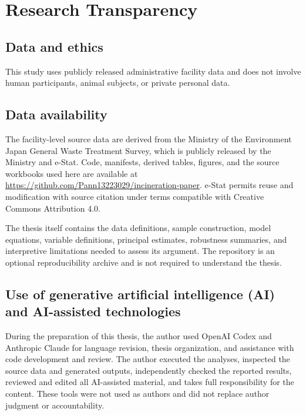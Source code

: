 \documentclass[12pt,a4paper]{article}
\begin{document}
\section*{Research Transparency}

\subsection*{Data and ethics}

This study uses publicly released administrative facility data and does not
involve human participants, animal subjects, or private personal data.

\subsection*{Data availability}

The facility-level source data are derived from the Ministry of the Environment
Japan General Waste Treatment Survey, which is publicly released by the
Ministry and e-Stat. Code, manifests, derived tables, figures, and the source
workbooks used here are available at
\url{https://github.com/Pann13223029/incineration-paper}. e-Stat permits reuse
and modification with source citation under terms compatible with Creative
Commons Attribution 4.0.

The thesis itself contains the data definitions, sample construction, model
equations, variable definitions, principal estimates, robustness summaries,
and interpretive limitations needed to assess its argument. The repository is
an optional reproducibility archive and is not required to understand the
thesis.

\subsection*{Use of generative artificial intelligence (AI) and AI-assisted
technologies}

During the preparation of this thesis, the author used OpenAI Codex and
Anthropic Claude for language revision, thesis organization, and assistance
with code development and review. The author executed the analyses, inspected
the source data and generated outputs, independently checked the reported
results, reviewed and edited all AI-assisted material, and takes full
responsibility for the content. These tools were not used as authors and did not
replace author judgment or accountability.
\end{document}
